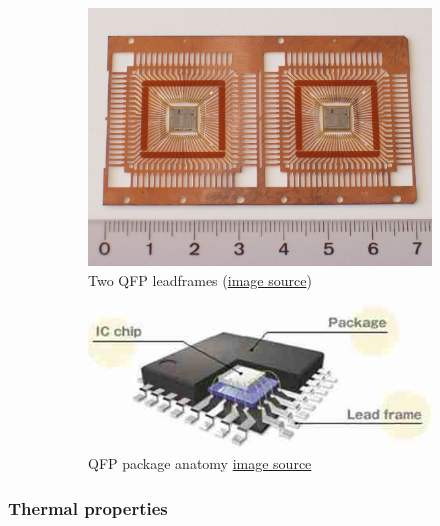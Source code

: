\documentclass[final]{cubedoc}
\begin{document}
	
	\begin{figure}[h!]
		\centering
		\begin{subfigure}{.5\textwidth}
			\centering
			\includegraphics[keepaspectratio, width=0.7\linewidth]{docs/leadframe_qfp.jpg}
			\caption{Two QFP leadframes \small{(\href{https://web.archive.org/web/20200818153249/https://commons.wikimedia.org/wiki/File:TQFP_Leadframe.jpg}{image source})}}
			\label{fig:sub1}
		\end{subfigure}%
		\begin{subfigure}{.5\textwidth}
			\centering
			\includegraphics[keepaspectratio, width=\linewidth, height=.6\textheight]{docs/qfp_anatomy.jpg}
			\caption{QFP package anatomy \small{\href{https://web.archive.org/web/20200818153744/http://resource.renesas.com/lib/eng/fab/index.html}{image source}}}
			\label{fig:sub2}
		\end{subfigure}
		\caption{}
		\label{fig:test}
	\end{figure}
	
	\subsubsection{Thermal properties}
	
\end{document}
